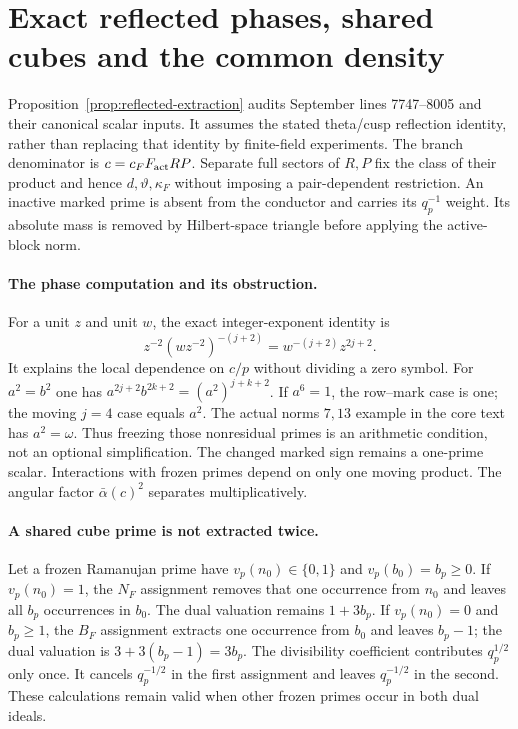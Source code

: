 \section{Exact reflected phases, shared cubes and the common density}
Proposition~\ref{prop:reflected-extraction} audits September
lines 7747--8005 and their canonical scalar inputs.
It assumes the stated theta/cusp reflection identity, rather than replacing
that identity by finite-field experiments.
The branch denominator is $c=c_FF_{\rm act}RP$.
Separate full sectors of $R,P$ fix the class of their product and hence
$d,\vartheta,\kappa_F$ without imposing a pair-dependent restriction.
An inactive marked prime is absent from the conductor and carries its
$q_p^{-1}$ weight. Its absolute mass is removed by Hilbert-space triangle
before applying the active-block norm.

\paragraph{The phase computation and its obstruction.}
For a unit $z$ and unit $w$, the exact integer-exponent identity is
\[
 z^{-2}(wz^{-2})^{-(j+2)}=w^{-(j+2)}z^{2j+2}.
\]
It explains the local dependence on $c/p$ without dividing a zero symbol.
For $a^2=b^2$ one has
$a^{2j+2}b^{2k+2}=(a^2)^{j+k+2}$.
If $a^6=1$, the row--mark case is one; the moving $j=4$ case equals
$a^2$. The actual norms $7,13$ example in the core text has $a^2=\omega$.
Thus freezing those nonresidual primes is an arithmetic condition, not
an optional simplification. The changed marked sign remains a one-prime
scalar. Interactions with frozen primes depend on only one moving product.
The angular factor $\bar\alpha(c)^2$ separates multiplicatively.

\paragraph{A shared cube prime is not extracted twice.}
Let a frozen Ramanujan prime have $v_p(n_0)\in\{0,1\}$ and
$v_p(b_0)=b_p\ge0$.
If $v_p(n_0)=1$, the $N_F$ assignment removes that one occurrence
from $n_0$ and leaves all $b_p$ occurrences in $b_0$.
The dual valuation remains $1+3b_p$.
If $v_p(n_0)=0$ and $b_p\ge1$, the $B_F$ assignment extracts one
occurrence from $b_0$ and leaves $b_p-1$; the dual valuation is
$3+3(b_p-1)=3b_p$.
The divisibility coefficient contributes $q_p^{1/2}$ only once.
It cancels $q_p^{-1/2}$ in the first assignment and leaves
$q_p^{-1/2}$ in the second. These calculations remain valid when
other frozen primes occur in both dual ideals.

